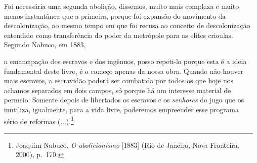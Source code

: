 Foi necessária uma segunda abolição, dissemos, muito mais complexa e
muito menos instantânea que a primeira, porque foi expansão do movimento
da descolonização, ao mesmo tempo em que foi recusa ao conceito de
descolonização entendido como transferência do poder da metrópole para
as elites crioulas. Segundo Nabuco, em 1883,

a emancipação dos escravos e dos ingênuos, posso repeti-lo porque esta é
a ideia fundamental deste livro, é o começo apenas da nossa obra. Quando
não houver mais escravos, a escravidão poderá ser combatida por todos os
que hoje nos achamos separados em dois campos, só porque há um interesse
material de permeio. Somente depois de libertados os escravos e os
\emph{senhores} do jugo que os inutiliza, igualmente, para a vida livre,
poderemos empreender esse programa sério de reformas (...).\footnote{Joaquim
  Nabuco, \emph{O abolicionismo} {[}1883{]} (Rio de Janeiro, Nova
  Fronteira, 2000), p.~170.}

